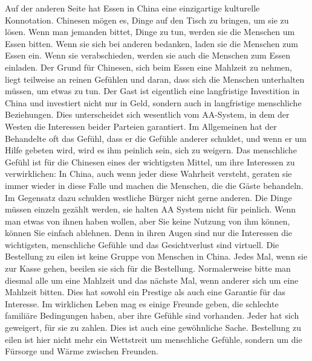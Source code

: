 Auf der anderen Seite hat Essen in China eine einzigartige kulturelle Konnotation. Chinesen mögen es, Dinge auf den Tisch zu bringen, um sie zu lösen. Wenn man jemanden bittet, Dinge zu tun, werden sie die Menschen um Essen bitten. Wenn sie sich bei anderen bedanken, laden sie die Menschen zum Essen ein. Wenn sie verabschieden, werden sie auch die Menschen zum Essen einladen. Der Grund für Chinesen, sich beim Essen eine Mahlzeit zu nehmen, liegt teilweise an reinen Gefühlen und daran, dass sich die Menschen unterhalten müssen, um etwas zu tun. Der Gast ist eigentlich eine langfristige Investition in China und investiert nicht nur in Geld, sondern auch in langfristige menschliche Beziehungen. Dies unterscheidet sich wesentlich vom AA-System, in dem der Westen die Interessen beider Parteien garantiert. Im Allgemeinen hat der Behandelte oft das Gefühl, dass er die Gefühle anderer schuldet, und wenn er um Hilfe gebeten wird, wird es ihm peinlich sein, sich zu weigern. Das menschliche Gefühl ist für die Chinesen eines der wichtigsten Mittel, um ihre Interessen zu verwirklichen: In China, auch wenn jeder diese Wahrheit versteht, geraten sie immer wieder in diese Falle und machen die Menschen, die die Gäste behandeln. Im Gegensatz dazu schulden westliche Bürger nicht gerne anderen. Die Dinge müssen einzeln gezählt werden, sie halten AA System nicht für peinlich. Wenn man etwas von ihnen haben wollen, aber Sie keine Nutzung von ihm können, können Sie einfach ablehnen. Denn in ihren Augen sind nur die Interessen die wichtigsten, menschliche Gefühle und das Gesichtverlust sind virtuell.
\mypar
Die Bestellung zu eilen ist keine Gruppe von Menschen in China. Jedes Mal, wenn sie zur Kasse gehen, beeilen sie sich für die Bestellung. Normalerweise bitte man diesmal alle um eine Mahlzeit und das nächste Mal, wenn anderer sich um eine Mahlzeit bitten. Dies hat sowohl ein Prestige als auch eine Garantie für das Interesse. Im wirklichen Leben mag es einige Freunde geben, die schlechte familiäre Bedingungen haben, aber ihre Gefühle sind vorhanden. Jeder hat sich geweigert, für sie zu zahlen. Dies ist auch eine gewöhnliche Sache. Bestellung zu eilen ist hier nicht mehr ein Wettstreit um menschliche Gefühle, sondern um die Fürsorge und Wärme zwischen Freunden.
